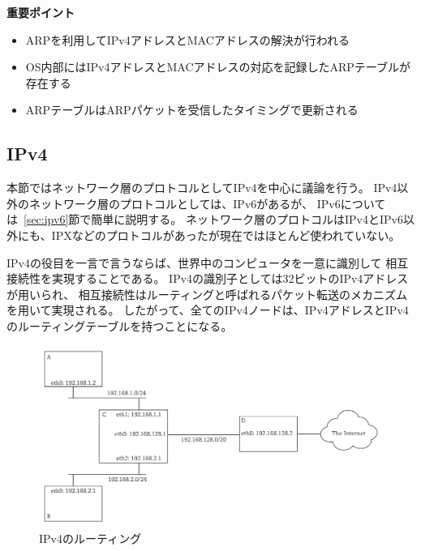 \begin{itembox}[l]{\bf 重要ポイント}
    \begin{itemize}
        \item ARPを利用してIPv4アドレスとMACアドレスの解決が行われる
        \item OS内部にはIPv4アドレスとMACアドレスの対応を記録したARPテーブルが存在する
        \item ARPテーブルはARPパケットを受信したタイミングで更新される
    \end{itemize}
\end{itembox}

\subsection{IPv4} \label{sec:network}

本節ではネットワーク層のプロトコルとしてIPv4を中心に議論を行う。
IPv4以外のネットワーク層のプロトコルとしては、IPv6があるが、
IPv6については~\ref{sec:ipv6}節で簡単に説明する。
ネットワーク層のプロトコルはIPv4とIPv6以外にも、IPXなどのプロトコルがあったが現在ではほとんど使われていない。

IPv4の役目を一言で言うならば、世界中のコンピュータを一意に識別して
相互接続性を実現することである。
IPv4の識別子としては32ビットのIPv4アドレスが用いられ、
相互接続性はルーティングと呼ばれるパケット転送のメカニズムを用いて実現される。
したがって、全てのIPv4ノードは、IPv4アドレスとIPv4のルーティングテーブルを持つことになる。

\begin{figure}[tb]
    \centering
    \includegraphics[width=15cm,pagebox=artbox]{figs/routing.pdf}
    \caption{IPv4のルーティング}
    \label{fig:routing}
\end{figure}


